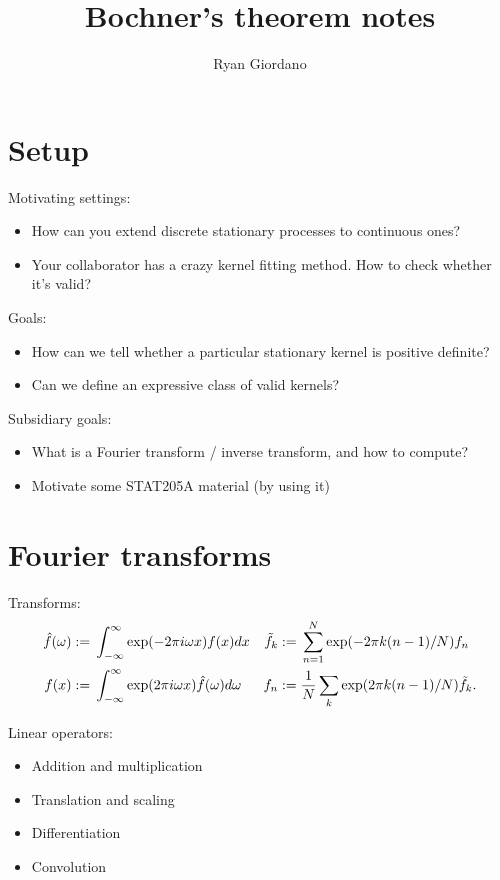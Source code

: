 \documentclass[twoside,11pt]{article}
\numberwithin{equation}{section}
\begin{document}
\title{Bochner's theorem notes}

\author{Ryan Giordano}

\maketitle

\section*{Setup}

Motivating settings:
%
\begin{itemize}
    \item How can you extend discrete stationary processes to continuous ones?
    \item Your collaborator has a crazy kernel fitting method.  How to check whether it's valid?
\end{itemize}
%

Goals:
%
\begin{itemize}
\item How can we tell whether a particular stationary kernel is positive definite?
\item Can we define an expressive class of valid kernels?
\end{itemize}


Subsidiary goals:
%
\begin{itemize}
\item What is a Fourier transform / inverse transform, and how to compute?
\item Motivate some STAT205A material (by using it)
\end{itemize}


\newpage
\section*{Fourier transforms}

Transforms:
%
\begin{align*}
    \hat{f}(\omega) :={}& \int_{-\infty}^{\infty} \exp(-2\pi i \omega x) f(x) dx &
    \tilde{f}_k :={}& \sum_{n=1}^N \exp(-2 \pi k (n - 1) / N) f_n \\
    f(x) :={}& \int_{-\infty}^{\infty} \exp(2\pi i \omega x) \hat{f}(\omega) d\omega &
    f_n :={}& \frac{1}{N} \sum_{k} \exp(2 \pi k (n - 1) / N) \tilde{f}_k.
\end{align*}
%

Linear operators:
%
\begin{itemize}
    \item Addition and multiplication
    \item Translation and scaling
    \item Differentiation
    \item Convolution
\end{itemize}
%
\end{document}
